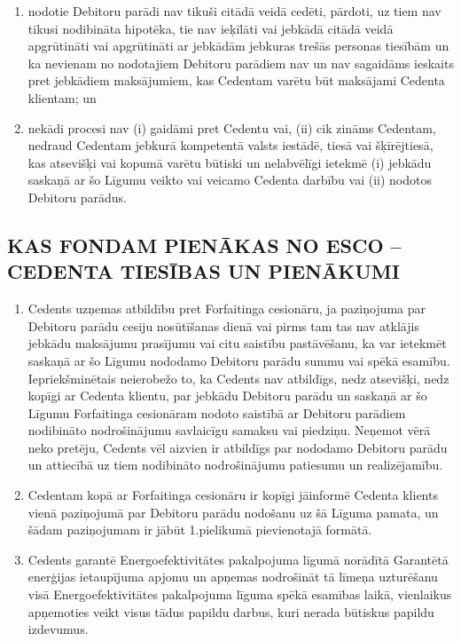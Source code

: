 \documentclass[a4paper]{article}
\begin{document}
\begin{multicols}{2}
\begin{enumerate}
\begin{enumerate}
    \item{nodotie Debitoru parādi nav tikuši citādā veidā cedēti,
pārdoti, uz tiem nav tikusi nodibināta hipotēka, tie nav ieķīlāti vai
jebkādā citādā veidā apgrūtināti vai apgrūtināti ar jebkādām jebkuras
trešās personas tiesībām un ka nevienam no nodotajiem Debitoru
parādiem nav un nav sagaidāms ieskaits pret jebkādiem maksājumiem,
kas Cedentam varētu būt maksājami Cedenta klientam; un}

    \item{nekādi procesi nav (i) gaidāmi pret Cedentu vai, (ii) cik
zināms Cedentam, nedraud Cedentam jebkurā kompetentā valsts
iestādē, tiesā vai šķīrējtiesā, kas atsevišķi vai kopumā varētu būtiski un
nelabvēlīgi ietekmē (i) jebkādu saskaņā ar šo Līgumu veikto vai veicamo
Cedenta darbību vai (ii) nodotos Debitoru parādus.}
    \end{enumerate}
  \end{enumerate}

  \subsection{KAS FONDAM PIENĀKAS NO ESCO – CEDENTA
TIESĪBAS UN PIENĀKUMI}

  \begin{enumerate}
  \item{Cedents uzņemas atbildību pret Forfaitinga cesionāru, ja paziņojuma
par Debitoru parādu cesiju nosūtīšanas dienā vai pirms tam tas nav
atklājis jebkādu maksājumu prasījumu vai citu saistību pastāvēšanu, ka
var ietekmēt saskaņā ar šo Līgumu nododamo Debitoru parādu summu
vai spēkā esamību. Iepriekšminētais neierobežo to, ka Cedents nav
atbildīgs, nedz atsevišķi, nedz kopīgi ar Cedenta klientu, par jebkādu
Debitoru parādu un saskaņā ar šo Līgumu Forfaitinga cesionāram
nodoto saistībā ar Debitoru parādiem nodibināto nodrošinājumu
savlaicīgu samaksu vai piedziņu. Neņemot vērā neko pretēju, Cedents vēl aizvien ir atbildīgs par nododamo Debitoru parādu un attiecībā uz
tiem nodibināto nodrošinājumu patiesumu un realizējamību.}


  \item{Cedentam kopā ar Forfaitinga cesionāru ir kopīgi jāinformē Cedenta
klients vienā paziņojumā par Debitoru parādu nodošanu uz šā Līguma
pamata, un šādam paziņojumam ir jābūt 1.pielikumā pievienotajā
formātā.}

  \item{Cedents garantē Energoefektivitātes pakalpojuma līgumā norādītā
Garantētā enerģijas ietaupījuma apjomu un apņemas nodrošināt tā
līmeņa uzturēšanu visā Energoefektivitātes pakalpojuma līguma spēkā
esamības laikā, vienlaikus apņemoties veikt visus tādus papildu darbus,
kuri nerada būtiskus papildu izdevumus.}


\end{enumerate}
\end{multicols}
\end{document}
